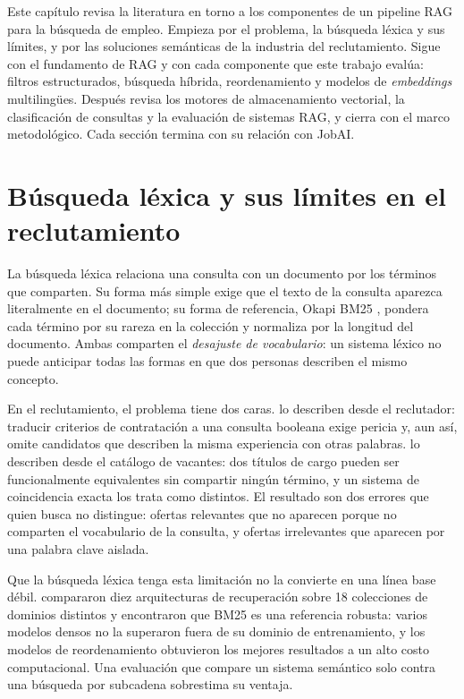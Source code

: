 Este capítulo revisa la literatura en torno a los componentes de un pipeline RAG para la búsqueda de empleo. Empieza por el problema, la búsqueda léxica y sus límites, y por las soluciones semánticas de la industria del reclutamiento. Sigue con el fundamento de RAG y con cada componente que este trabajo evalúa: filtros estructurados, búsqueda híbrida, reordenamiento y modelos de \textit{embeddings} multilingües. Después revisa los motores de almacenamiento vectorial, la clasificación de consultas y la evaluación de sistemas RAG, y cierra con el marco metodológico. Cada sección termina con su relación con JobAI.

\section{Búsqueda léxica y sus límites en el reclutamiento}
\label{sec:estado-arte-keyword}

La búsqueda léxica relaciona una consulta con un documento por los términos que comparten. Su forma más simple exige que el texto de la consulta aparezca literalmente en el documento; su forma de referencia, Okapi BM25 \citep{Robertson2009}, pondera cada término por su rareza en la colección y normaliza por la longitud del documento. Ambas comparten el \emph{desajuste de vocabulario}: un sistema léxico no puede anticipar todas las formas en que dos personas describen el mismo concepto.

En el reclutamiento, el problema tiene dos caras. \citet{HaThuc2017} lo describen desde el reclutador: traducir criterios de contratación a una consulta booleana exige pericia y, aun así, omite candidatos que describen la misma experiencia con otras palabras. \citet{Bocharova2023} lo describen desde el catálogo de vacantes: dos títulos de cargo pueden ser funcionalmente equivalentes sin compartir ningún término, y un sistema de coincidencia exacta los trata como distintos. El resultado son dos errores que quien busca no distingue: ofertas relevantes que no aparecen porque no comparten el vocabulario de la consulta, y ofertas irrelevantes que aparecen por una palabra clave aislada.

Que la búsqueda léxica tenga esta limitación no la convierte en una línea base débil. \citet{Thakur2021} compararon diez arquitecturas de recuperación sobre 18 colecciones de dominios distintos y encontraron que BM25 es una referencia robusta: varios modelos densos no la superaron fuera de su dominio de entrenamiento, y los modelos de reordenamiento obtuvieron los mejores resultados a un alto costo computacional. Una evaluación que compare un sistema semántico solo contra una búsqueda por subcadena sobrestima su ventaja.

